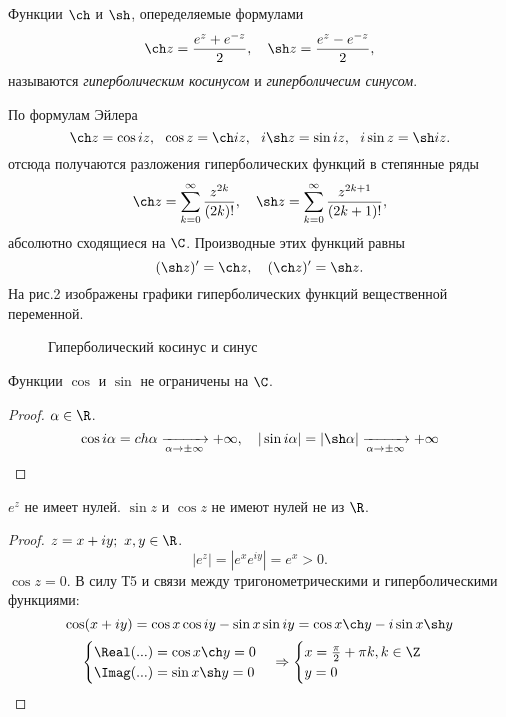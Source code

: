 \begin{Def}
    Функции $\ch$ и $\sh$, опеределяемые формулами
    $$\ch z = \frac{e^z + e^{-z}}{2}, \ \ \ \sh z = \frac{e^z - e^{-z}}{2},$$
    называются \textit{гиперболическим косинусом} и \textit{гиперболичесим синусом}.   
\end{Def}

\begin{Rem}
    По формулам Эйлера
    $$\ch z = \cos iz, \ \ \cos z = \ch iz, \ \ i\sh z = \sin iz, \ \ i \sin z = \sh iz.$$
    отсюда получаются разложения гиперболических функций в степянные ряды 
    $$\ch z = \sum_{k = 0}^{\infty} \frac{z^{2k}}{(2k)!}, \ \ \ \sh z = \sum_{k = 0}^{\infty} \frac{z^{2k + 1}}{(2k + 1)!},$$
    абсолютно сходящиеся на $\C$. Производные этих функций равны 
    $$(\sh z)' = \ch z, \ \ \ (\ch z)' = \sh z.$$
    На рис.2 изображены графики гиперболических функций вещественной переменной.
\end{Rem}

\begin{figure*}[h]
	\centering
	\def\svgwidth{0.35\columnwidth}
	
	\caption{Гиперболический косинус и синус}
\end{figure*}

\begin{Thm}[T6]
    Функции $\cos$ и $\sin$ не ограничены на $\C$.
\end{Thm}

\begin{proof}
    $\alpha \in \R$.
    $$\cos i\alpha =ch \alpha \xrightarrow[\alpha \to \pm\infty]{} +\infty, \ \ \ 
    |\sin i \alpha| = |\sh \alpha| \xrightarrow[\alpha \to \pm \infty]{} + \infty$$
\end{proof}

\begin{Thm}[T7]
    $e^z$ не имеет нулей. $\sin z$ и $\cos z$ не имеют нулей не из $\R$.
\end{Thm}

\begin{proof}
    $z = x + iy; \ x, y \in \R$.\\
    $$|e^z| = |e^x e^{iy}| = e^x > 0.$$
    $\cos z = 0$. В силу Т5 и связи между тригонометрическими и гиперболическими функциями:
    $$\cos (x + iy) = \cos x \cos iy - \sin x \sin iy = \cos x \ch y - i\sin x \sh y$$
    $$\begin{cases}
        \Real(...) = \cos x \ch y = 0 \\
        \Imag (...) = \sin x \sh y = 0
    \end{cases} \Rightarrow 
    \begin{cases}
        x = \frac{\pi}{2} + \pi k, k \in \Z \\
        y = 0
    \end{cases}$$
\end{proof}

